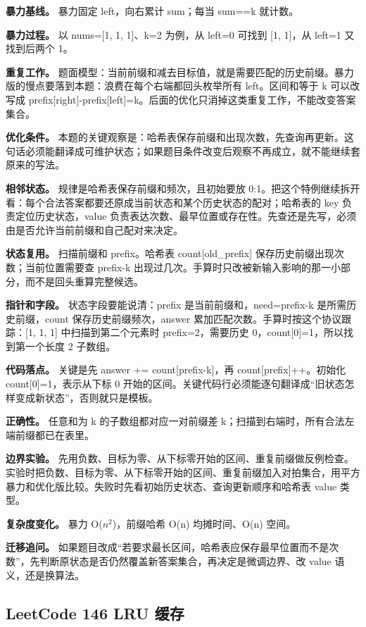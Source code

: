 \textbf{暴力基线。} 暴力固定 left，向右累计 sum；每当 sum==k 就计数。

\textbf{暴力过程。} 以 nums=[1, 1, 1]、k=2 为例，从 left=0 可找到 [1, 1]，从 left=1 又找到后两个 1。

\textbf{重复工作。} 题面模型：当前前缀和减去目标值，就是需要匹配的历史前缀。暴力版的慢点要落到本题：浪费在每个右端都回头枚举所有 left。区间和等于 k 可以改写成 prefix[right]-prefix[left]=k。后面的优化只消掉这类重复工作，不能改变答案集合。

\textbf{优化条件。} 本题的关键观察是：哈希表保存前缀和出现次数，先查询再更新。这句话必须能翻译成可维护状态；如果题目条件改变后观察不再成立，就不能继续套原来的写法。

\textbf{相邻状态。} 规律是哈希表保存前缀和频次，且初始要放 0:1。把这个特例继续拆开看：每个合法答案都要还原成当前状态和某个历史状态的配对；哈希表的 key 负责定位历史状态，value 负责表达次数、最早位置或存在性。先查还是先写，必须由是否允许当前前缀和自己配对来决定。

\textbf{状态复用。} 扫描前缀和 prefix。哈希表 count[old\_prefix] 保存历史前缀出现次数；当前位置需要查 prefix-k 出现过几次。手算时只改被新输入影响的那一小部分，而不是回头重算完整候选。

\textbf{指针和字段。} 状态字段要能说清：prefix 是当前前缀和，need=prefix-k 是所需历史前缀，count 保存历史前缀频次，answer 累加匹配次数。手算时按这个协议跟踪：[1, 1, 1] 中扫描到第二个元素时 prefix=2，需要历史 0，count[0]=1，所以找到第一个长度 2 子数组。

\textbf{代码落点。} 关键是先 answer += count[prefix-k]，再 count[prefix]++。初始化 count[0]=1，表示从下标 0 开始的区间。关键代码行必须能逐句翻译成“旧状态怎样变成新状态”，否则就只是模板。

\textbf{正确性。} 任意和为 k 的子数组都对应一对前缀差 k；扫描到右端时，所有合法左端前缀都已在表里。

\textbf{边界实验。} 先用负数、目标为零、从下标零开始的区间、重复前缀做反例检查。实验时把负数、目标为零、从下标零开始的区间、重复前缀加入对拍集合，用平方暴力和优化版比较。失败时先看初始历史状态、查询更新顺序和哈希表 value 类型。

\textbf{复杂度变化。} 暴力 O(\ensuremath{n^{2}})，前缀哈希 O(n) 均摊时间、O(n) 空间。

\textbf{迁移追问。} 如果题目改成“若要求最长区间，哈希表应保存最早位置而不是次数”，先判断原状态是否仍然覆盖新答案集合，再决定是微调边界、改 value 语义，还是换算法。

\subsection{LeetCode 146 LRU 缓存}

